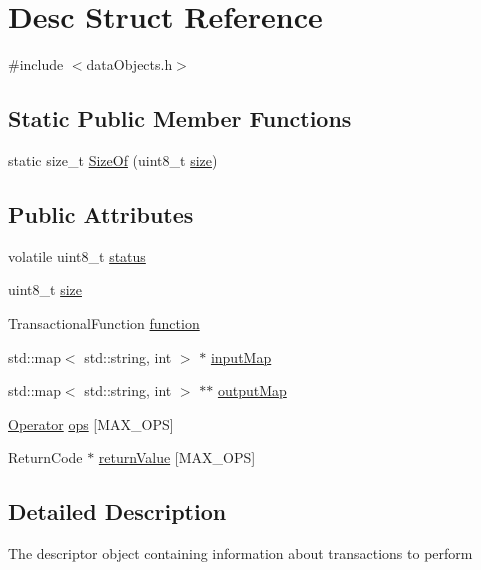 \hypertarget{structDesc}{}\section{Desc Struct Reference}
\label{structDesc}


{\ttfamily \#include $<$data\+Objects.\+h$>$}

\subsection*{Static Public Member Functions}
\begin{DoxyCompactItemize}
\item 
static size\+\_\+t \hyperlink{structDesc_a17991ab3e594e316aba8e6f3016e1f02}{Size\+Of} (uint8\+\_\+t \hyperlink{structDesc_a1a146b0ca2a38b593e7605d66eb95a18}{size})
\end{DoxyCompactItemize}
\subsection*{Public Attributes}
\begin{DoxyCompactItemize}
\item 
volatile uint8\+\_\+t \hyperlink{structDesc_a8ab3f25f43809ec536df5c68375010e2}{status}
\item 
uint8\+\_\+t \hyperlink{structDesc_a1a146b0ca2a38b593e7605d66eb95a18}{size}
\item 
Transactional\+Function \hyperlink{structDesc_a1d85f0de5ea67a2031e1675bab8acb5e}{function}
\item 
std\+::map$<$ std\+::string, int $>$ $\ast$ \hyperlink{structDesc_a8aacd8e82f593984cf4b792bbe0d0dff}{input\+Map}
\item 
std\+::map$<$ std\+::string, int $>$ $\ast$$\ast$ \hyperlink{structDesc_a41ba9397b67c78e2a45e49859dcdfff0}{output\+Map}
\item 
\hyperlink{structOperator}{Operator} \hyperlink{structDesc_a38e80352bf58db5502a73610210035d7}{ops} \mbox{[}M\+A\+X\+\_\+\+O\+PS\mbox{]}
\item 
Return\+Code $\ast$ \hyperlink{structDesc_aa3578181a26fc43b204648634e64546c}{return\+Value} \mbox{[}M\+A\+X\+\_\+\+O\+PS\mbox{]}
\end{DoxyCompactItemize}


\subsection{Detailed Description}
The descriptor object containing information about transactions to perform 

